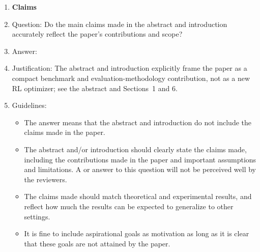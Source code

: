 \documentclass{article}
\begin{document}
\begin{enumerate}

\item {\bf Claims}
    \item[] Question: Do the main claims made in the abstract and introduction accurately reflect the paper's contributions and scope?
    \item[] Answer: \answerYes{}
    \item[] Justification: The abstract and introduction explicitly frame the paper as a compact benchmark and evaluation-methodology contribution, not as a new RL optimizer; see the abstract and Sections~1 and 6.
    \item[] Guidelines:
    \begin{itemize}
        \item The answer \answerNA{} means that the abstract and introduction do not include the claims made in the paper.
        \item The abstract and/or introduction should clearly state the claims made, including the contributions made in the paper and important assumptions and limitations. A \answerNo{} or \answerNA{} answer to this question will not be perceived well by the reviewers.
        \item The claims made should match theoretical and experimental results, and reflect how much the results can be expected to generalize to other settings.
        \item It is fine to include aspirational goals as motivation as long as it is clear that these goals are not attained by the paper.
    \end{itemize}


\end{enumerate}
\end{document}
